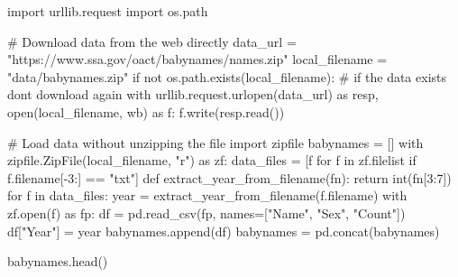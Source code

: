 \documentclass[
  letterpaper,
  DIV=11,
  numbers=noendperiod]{scrreprt}
\newenvironment{Shaded}{\begin{snugshade}}{\end{snugshade}}
\newcommand{\BuiltInTok}[1]{\textcolor[rgb]{0.00,0.23,0.31}{#1}}
\newcommand{\CommentTok}[1]{\textcolor[rgb]{0.37,0.37,0.37}{#1}}
\newcommand{\ControlFlowTok}[1]{\textcolor[rgb]{0.00,0.23,0.31}{#1}}
\newcommand{\DecValTok}[1]{\textcolor[rgb]{0.68,0.00,0.00}{#1}}
\newcommand{\ImportTok}[1]{\textcolor[rgb]{0.00,0.46,0.62}{#1}}
\newcommand{\KeywordTok}[1]{\textcolor[rgb]{0.00,0.23,0.31}{#1}}
\newcommand{\NormalTok}[1]{\textcolor[rgb]{0.00,0.23,0.31}{#1}}
\newcommand{\OperatorTok}[1]{\textcolor[rgb]{0.37,0.37,0.37}{#1}}
\newcommand{\StringTok}[1]{\textcolor[rgb]{0.13,0.47,0.30}{#1}}
\begin{document}
\begin{Shaded}
\begin{Highlighting}[]
\ImportTok{import}\NormalTok{ urllib.request}
\ImportTok{import}\NormalTok{ os.path}

\CommentTok{\# Download data from the web directly}
\NormalTok{data\_url }\OperatorTok{=} \StringTok{"https://www.ssa.gov/oact/babynames/names.zip"}
\NormalTok{local\_filename }\OperatorTok{=} \StringTok{"data/babynames.zip"}
\ControlFlowTok{if} \KeywordTok{not}\NormalTok{ os.path.exists(local\_filename): }\CommentTok{\# if the data exists don\textquotesingle{}t download again}
    \ControlFlowTok{with}\NormalTok{ urllib.request.urlopen(data\_url) }\ImportTok{as}\NormalTok{ resp, }\BuiltInTok{open}\NormalTok{(local\_filename, }\StringTok{\textquotesingle{}wb\textquotesingle{}}\NormalTok{) }\ImportTok{as}\NormalTok{ f:}
\NormalTok{        f.write(resp.read())}

        
\CommentTok{\# Load data without unzipping the file}
\ImportTok{import}\NormalTok{ zipfile}
\NormalTok{babynames }\OperatorTok{=}\NormalTok{ [] }
\ControlFlowTok{with}\NormalTok{ zipfile.ZipFile(local\_filename, }\StringTok{"r"}\NormalTok{) }\ImportTok{as}\NormalTok{ zf:}
\NormalTok{    data\_files }\OperatorTok{=}\NormalTok{ [f }\ControlFlowTok{for}\NormalTok{ f }\KeywordTok{in}\NormalTok{ zf.filelist }\ControlFlowTok{if}\NormalTok{ f.filename[}\OperatorTok{{-}}\DecValTok{3}\NormalTok{:] }\OperatorTok{==} \StringTok{"txt"}\NormalTok{]}
    \KeywordTok{def}\NormalTok{ extract\_year\_from\_filename(fn):}
        \ControlFlowTok{return} \BuiltInTok{int}\NormalTok{(fn[}\DecValTok{3}\NormalTok{:}\DecValTok{7}\NormalTok{])}
    \ControlFlowTok{for}\NormalTok{ f }\KeywordTok{in}\NormalTok{ data\_files:}
\NormalTok{        year }\OperatorTok{=}\NormalTok{ extract\_year\_from\_filename(f.filename)}
        \ControlFlowTok{with}\NormalTok{ zf.}\BuiltInTok{open}\NormalTok{(f) }\ImportTok{as}\NormalTok{ fp:}
\NormalTok{            df }\OperatorTok{=}\NormalTok{ pd.read\_csv(fp, names}\OperatorTok{=}\NormalTok{[}\StringTok{"Name"}\NormalTok{, }\StringTok{"Sex"}\NormalTok{, }\StringTok{"Count"}\NormalTok{])}
\NormalTok{            df[}\StringTok{"Year"}\NormalTok{] }\OperatorTok{=}\NormalTok{ year}
\NormalTok{            babynames.append(df)}
\NormalTok{babynames }\OperatorTok{=}\NormalTok{ pd.concat(babynames)}
\end{Highlighting}
\end{Shaded}

\begin{Shaded}
\begin{Highlighting}[]
\NormalTok{babynames.head()}
\end{Highlighting}
\end{Shaded}
\end{document}
